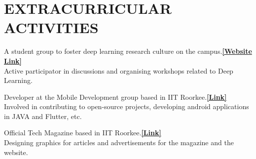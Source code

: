 \documentclass[letterpaper]{deedy-resume} %
\begin{document}
\begin{minipage}[t]{0.66\textwidth}

\section{EXTRACURRICULAR ACTIVITIES} 

\textbullet{} A student group to foster deep learning research culture on the campus.\href{https://vlgiitr.github.io/}{\bf [Website Link]} \\
\textbullet{} Active participator in discussions and organising workshops related to Deep
Learning. \\

\sectionspace %



\textbullet{} Developer at the Mobile Development group based in IIT Roorkee.\href{https://mdg.iitr.ac.in/}{\bf [Link]}\\
\textbullet{} Involved in contributing to open-source projects, developing android applications in JAVA and Flutter, etc. \\

\sectionspace %



\textbullet{} Official Tech Magazine based in IIT Roorkee.\href{https://geekgazette.org/}{\bf [Link]}\\
\textbullet{} Designing graphics for articles and advertisements for  the magazine and the website. \\

\sectionspace %


\end{minipage} %
\end{document}
